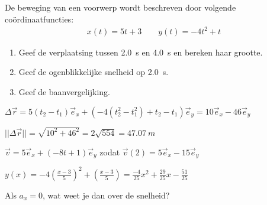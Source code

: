 \documentclass{ximera}
\begin{document}
\begin{exercise} De beweging van een voorwerp wordt beschreven door volgende coördinaatfuncties:
\begin{eqnarray*}
x(t)=5t+3\qquad y(t)=-4t^2+t
\end{eqnarray*}
\begin{enumerate}
\item Geef de verplaatsing tussen \SI{2,0}{s} en \SI{4,0}{s} en bereken haar grootte.
\item Geef de ogenblikkelijke snelheid op \SI{2,0}{s}.
\item Geef de baanvergelijking.
\end{enumerate}

\begin{oplossing}
$\Delta\vec{r}=5(t_2-t_1)\vec{e}_x+(-4(t_2^2-t_1^2)+t_2-t_1)\vec{e}_y=10\vec{e}_x-46\vec{e}_y$

$||\Delta\vec{r}||=\sqrt{10^2+46^2}=2\sqrt{554}=\SI{47,07}{m}$

$\vec{v}=5\vec{e}_x+(-8t+1)\vec{e}_y$ zodat $\vec{v}(2)=5\vec{e}_x-15\vec{e}_y$

$y(x)=-4\left(\frac{x-3}{5}\right)^2+\left(\frac{x-3}{5}\right)=\frac{-4}{25}x^{2} + \frac{29}{25}x - \frac{51}{25}$

\end{oplossing}
\end{exercise}

\begin{exercise}
	Als $a_x=0$, wat weet je dan over de snelheid?
\end{exercise}
\end{document}
